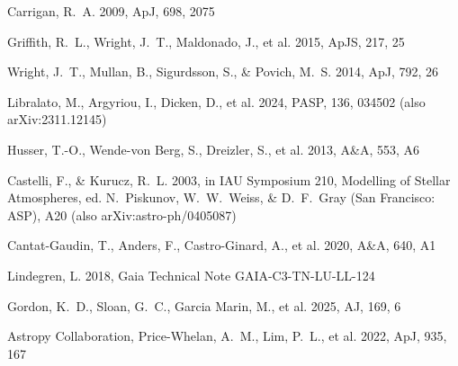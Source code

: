 \documentclass[RNAAS]{aastex7}
\begin{document}

\begin{thebibliography}{}

 Carrigan, R.~A. 2009, ApJ, 698, 2075

 Griffith, R.~L., Wright, J.~T., Maldonado, J., et al. 2015, ApJS, 217, 25

 Wright, J.~T., Mullan, B., Sigurdsson, S., \& Povich, M.~S. 2014, ApJ, 792, 26

 Libralato, M., Argyriou, I., Dicken, D., et al. 2024, PASP, 136, 034502 (also arXiv:2311.12145)

 Husser, T.-O., Wende-von Berg, S., Dreizler, S., et al. 2013, A\&A, 553, A6

 Castelli, F., \& Kurucz, R.~L. 2003, in IAU Symposium 210, Modelling of Stellar Atmospheres, ed. N.~Piskunov, W.~W.~Weiss, \& D.~F.~Gray (San Francisco: ASP), A20 (also arXiv:astro-ph/0405087)

 Cantat-Gaudin, T., Anders, F., Castro-Ginard, A., et al. 2020, A\&A, 640, A1

 Lindegren, L. 2018, Gaia Technical Note GAIA-C3-TN-LU-LL-124

 Gordon, K.~D., Sloan, G.~C., Garcia Marin, M., et al. 2025, AJ, 169, 6

 Astropy Collaboration, Price-Whelan, A.~M., Lim, P.~L., et al. 2022, ApJ, 935, 167

\end{thebibliography}
\end{document}
